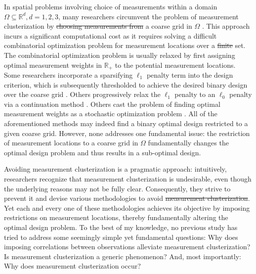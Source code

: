 \documentclass[ba]{imsart}
\theoremstyle{plain}
\theoremstyle{definition}
\theoremstyle{remark}
\providecommand{\DIFaddtex}[1]{{\protect\color{blue}\uwave{#1}}} %
\providecommand{\DIFdeltex}[1]{{\protect\color{red}\sout{#1}}}                      %
\providecommand{\DIFaddbegin}{} %
\providecommand{\DIFaddend}{} %
\providecommand{\DIFdelbegin}{} %
\providecommand{\DIFdelend}{} %
\providecommand{\DIFadd}[1]{\texorpdfstring{\DIFaddtex{#1}}{#1}} %
\providecommand{\DIFdel}[1]{\texorpdfstring{\DIFdeltex{#1}}{}} %
\newcommand{\DIFscaledelfig}{0.5}
\newlength{\DIFdelgraphicswidth} %
\newlength{\DIFdelgraphicsheight} %
\newcommand{\DIFaddincludegraphics}[2][]{{\color{blue}\fbox{\DIFOincludegraphics[#1]{#2}}}} %
\newcommand{\DIFdelincludegraphics}[2][]{%
\sbox{\DIFdelgraphicsbox}{\DIFOincludegraphics[#1]{#2}}%
\settoboxwidth{\DIFdelgraphicswidth}{\DIFdelgraphicsbox} %
\settoboxtotalheight{\DIFdelgraphicsheight}{\DIFdelgraphicsbox} %
\scalebox{\DIFscaledelfig}{%
\parbox[b]{\DIFdelgraphicswidth}{\usebox{\DIFdelgraphicsbox}\\[-\baselineskip] \rule{\DIFdelgraphicswidth}{0em}}\llap{\resizebox{\DIFdelgraphicswidth}{\DIFdelgraphicsheight}{%
\setlength{\unitlength}{\DIFdelgraphicswidth}%
\begin{picture}(1,1)%
\thicklines\linethickness{2pt} %
{\color[rgb]{1,0,0}\put(0,0){\framebox(1,1){}}}%
{\color[rgb]{1,0,0}\put(0,0){\line( 1,1){1}}}%
{\color[rgb]{1,0,0}\put(0,1){\line(1,-1){1}}}%
\end{picture}%
}\hspace*{3pt}}} %
} %
\DeclareRobustCommand{\DIFaddbegin}{\DIFOaddbegin \let\includegraphics\DIFaddincludegraphics} %
\DeclareRobustCommand{\DIFaddend}{\DIFOaddend \let\includegraphics\DIFOincludegraphics} %
\DeclareRobustCommand{\DIFdelbegin}{\DIFOdelbegin \let\includegraphics\DIFdelincludegraphics} %
\DeclareRobustCommand{\DIFdelend}{\DIFOaddend \let\includegraphics\DIFOincludegraphics} %
\begin{document}
In spatial problems involving choice of measurements within a domain
\(\Omega \subseteq \mathbb{R}^d, d=1,2,3\), many researchers
circumvent the problem of measurement clusterization by \DIFdelbegin \DIFdel{choosing
measurements from }\DIFdelend \DIFaddbegin \DIFadd{restricting
measurements to }\DIFaddend a coarse grid in \(\Omega\) \cite{koval2020,
  alexanderian2021, attia2022, alexanderian2014, alexanderian2016,
  alexanderian2018efficient, brunton2016}. This approach incurs a
significant computational cost as it requires solving a difficult
combinatorial optimization problem for measurement locations over a
\DIFdelbegin \DIFdel{finite }\DIFdelend \DIFaddbegin \DIFadd{discrete }\DIFaddend set. The combinatorial optimization problem is usually
relaxed by first assigning optimal measurement weights in
\(\mathbb{R}_+\) to the potential measurement locations. Some
researchers incorporate a sparsifying \(\ell_1\) penalty term into the
design criterion, which is subsequently thresholded to achieve the
desired binary design over the coarse grid
\cite{horesh2008borehole}. Others progressively relax the \(\ell_1\)
penalty to an \(\ell_0\) penalty via a continuation method
\cite{alexanderian2016, alexanderian2014}. Others cast the problem of
finding optimal measurement weights as a stochastic optimization
problem \cite{attia2022stochastic}. All of the aforementioned methods
may indeed find a binary optimal design restricted to a given coarse
grid. However, none addresses one fundamental issue: the restriction
of measurement locations to a coarse grid in \(\Omega\) fundamentally
changes the optimal design problem and thus results in a sub-optimal
design.

Avoiding measurement clusterization is a pragmatic approach:
intuitively, researchers recognize that measurement clusterization is
undesirable, even though the underlying reasons may not be fully
clear. Consequently, they strive to prevent it and devise various
methodologies to avoid \DIFdelbegin \DIFdel{measurement clusterization}\DIFdelend \DIFaddbegin \DIFadd{it}\DIFaddend . Yet each and every one of these
methodologies achieves its objective by imposing restrictions on
measurement locations, thereby fundamentally altering the optimal
design problem. To the best of my knowledge, no previous study has
tried to address some seemingly simple yet fundamental questions:
Why does imposing correlations between observations alleviate
measurement clusterization?
Is measurement clusterization a generic phenomenon? 
And, most importantly: Why does measurement clusterization occur?
\end{document}

